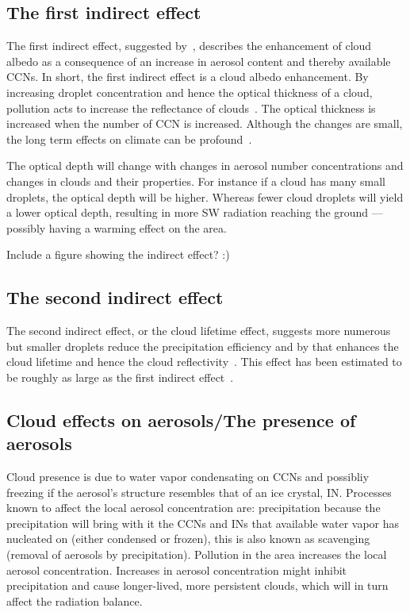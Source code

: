 \subsection{The first indirect effect}%
The first indirect effect, suggested by~\citet{Twomey1974}, describes the enhancement of cloud albedo as a consequence of an increase in aerosol content and thereby available CCNs.
In short, the first indirect effect is a cloud albedo enhancement.
By increasing droplet concentration and hence the optical thickness of a cloud, pollution acts to increase the reflectance of clouds~\citep{Twomey1977}. 
The optical thickness is increased when the number of CCN is increased. Although the changes are small, the long term effects on climate can be profound~\citep{Twomey1974}.

The optical depth will change with changes in aerosol number concentrations and changes in clouds and their properties. For instance if a cloud has many small droplets, the optical depth will be higher. Whereas  fewer cloud droplets will yield a lower optical depth, resulting in more SW radiation reaching the ground — possibly having a warming effect on the area. 

Include a figure showing the indirect effect? :)

\subsection{The second indirect effect}
The second indirect effect, or the cloud lifetime effect, suggests more numerous but smaller droplets reduce the precipitation efficiency and by that enhances the cloud lifetime and hence the cloud reflectivity~\citep{Albrecht1989}. This effect has been estimated to be roughly as large as the first indirect effect~\citep{Lohmann2005}.

\subsection{Cloud effects on aerosols/The presence of aerosols}
Cloud presence is due to water vapor condensating on CCNs and possibliy freezing if the aerosol's structure resembles that of an ice crystal, IN. Processes known to affect the local aerosol concentration are: precipitation because the precipitation will bring with it the CCNs and INs that available water vapor has nucleated on (either condensed or frozen), this is also known as scavenging (removal of aerosols by precipitation). Pollution in the area increases the local aerosol concentration. Increases in aerosol concentration might inhibit precipitation and cause longer-lived, more persistent clouds, which will in turn affect the radiation balance.